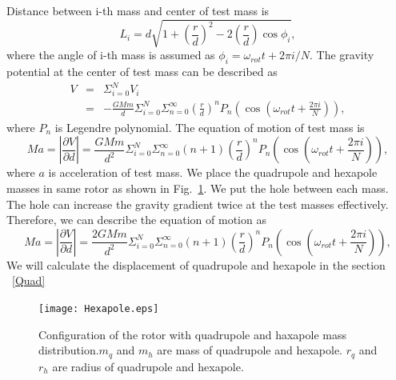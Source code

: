 \documentclass[A4]{spie}  %
\begin{document}
Distance between i-th mass and center of test mass is 
\begin{equation}
L_i=d \sqrt{1+\left( \frac{r}{d} \right)^2 -2\left( \frac{r}{d} \right) \cos{\phi_i} },
\end{equation}
where the angle of i-th mass is assumed as $\phi_i=\omega_{rot} t + 2\pi i/N$.
The gravity potential at the center of test mass can be described as
\begin{eqnarray}
V &=& \Sigma^N_{i=0} V_i \\
&=&-\frac{GMm}{d} \Sigma^N_{i=0} \Sigma^{\infty}_{n=0} \left( \frac{r}{d} \right)^n P_n\left(\cos{\left(\omega_{rot} t +\frac{2 \pi i}{N}\right)}\right),
\end{eqnarray}
where $P_n$ is Legendre polynomial. The equation of motion of test mass is 
\begin{equation}
Ma=\left| \frac{\partial V}{\partial{d}} \right| =\frac{GMm}{d^2}\Sigma^N_{i=0} \Sigma^{\infty}_{n=0}(n+1) \left( \frac{r}{d} \right)^n P_n\left(\cos{\left(\omega_{rot} t +\frac{2 \pi i}{N}\right)}\right),
\end{equation}
where $a$ is acceleration of test mass. We place the quadrupole and hexapole masses in same rotor as shown in Fig.~\ref{fig:hex}. We put the hole between each mass. The hole can increase the gravity gradient twice at the test masses effectively. Therefore, we can describe the equation of motion as 
\begin{equation}
Ma=\left| \frac{\partial V}{\partial{d}} \right| =\frac{2GMm}{d^2}\Sigma^N_{i=0} \Sigma^{\infty}_{n=0}(n+1) \left( \frac{r}{d} \right)^n P_n\left(\cos{\left(\omega_{rot} t +\frac{2 \pi i}{N}\right)}\right),
\end{equation}
We will calculate the displacement of quadrupole and hexapole in the section ~\ref{Quad} 

\begin{figure}
\begin{center}
\texttt{[image: Hexapole.eps]}
\caption{Configuration of the rotor with quadrupole and haxapole mass distribution.$m_q$ and $m_h$ are mass of quadrupole and hexapole. $r_q$ and $r_h$ are radius of quadrupole and hexapole.}
\label{fig:hex}
\end{center}
\end{figure}
\end{document}
